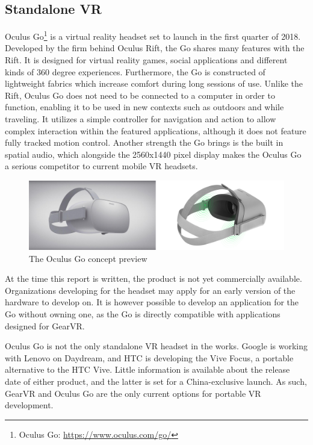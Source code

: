 	  	\subsection{Standalone VR}\label{sec:standaloneVR}
	  	Oculus Go\footnote{Oculus Go: \url{https://www.oculus.com/go/}} is a virtual reality headset set to launch in the first quarter of 2018. Developed by the firm behind Oculus Rift, the Go shares many features with the Rift. It is designed for virtual reality games, social applications and different kinds of 360 degree experiences. Furthermore, the Go is constructed of lightweight fabrics which increase comfort during long sessions of use. Unlike the Rift, Oculus Go does not need to be connected to a computer in order to function, enabling it to be used in new contexts such as outdoors and while traveling. It utilizes a simple controller for navigation and action to allow complex interaction within the featured applications, although it does not feature fully tracked motion control. Another strength the Go brings is the built in spatial audio, which alongside the 2560x1440 pixel display makes the Oculus Go a serious competitor to current mobile VR headsets.  \\
	  	\begin{figure}[H]
	  		\centering
	  		\includegraphics[width=1.0\linewidth]{figure/Analysis/oculusgo}
	  		\caption{The Oculus Go concept preview}
	  		\label{fig:Oculus}
	  	\end{figure}
	  	
	  	At the time this report is written, the product is not yet commercially available. Organizations developing for the headset may apply for an early version of the hardware to develop on. It is however possible to develop an application for the Go without owning one, as the Go is directly compatible with applications designed for GearVR. 
	  	
	  	Oculus Go is not the only standalone VR headset in the works. Google is working with Lenovo on Daydream, and HTC is developing the Vive Focus, a portable alternative to the HTC Vive. Little information is available about the release date of either product, and the latter is set for a China-exclusive launch. As such, GearVR and Oculus Go are the only current options for portable VR development. 
	  
